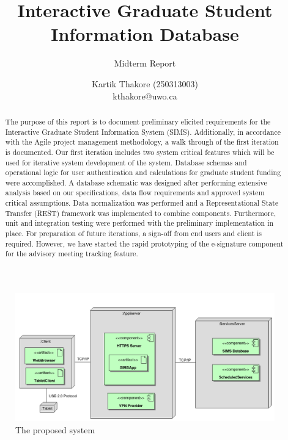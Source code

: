 \documentclass{journal}
\begin{document}

\nocite{*}
\title{Interactive Graduate Student Information Database}
\subtitle{Midterm Report} 
\author{Kartik Thakore (250313003)\\kthakore@uwo.ca}
\maketitle

\begin{abstract}
The purpose of this report is to document preliminary elicited requirements for the Interactive Graduate Student Information System (SIMS). Additionally, in accordance with the Agile project management methodology, a walk through of the first iteration is documented. Our first iteration includes two system critical features which will be used for iterative system development of the system. Database schemas and operational logic for user authentication and calculations for graduate student funding were accomplished.  A database schematic was designed after performing extensive analysis based on our specifications, data flow requirements and approved system critical assumptions. Data normalization was performed and a Representational State Transfer (REST) framework was implemented to combine components. Furthermore, unit and integration testing were performed with the preliminary implementation in place. For preparation of future iterations, a sign-off from end users and client is required. However, we have started the rapid prototyping of the e-signature component for the advisory meeting tracking feature. 
\end{abstract}


\begin{figure}[!h]
\begin{center}
\includegraphics[width=522px]{diagrams/SystemOverview} \caption{ The proposed system } \label{fig:sysOver}

\end{center}
\end{figure}
\end{document}
